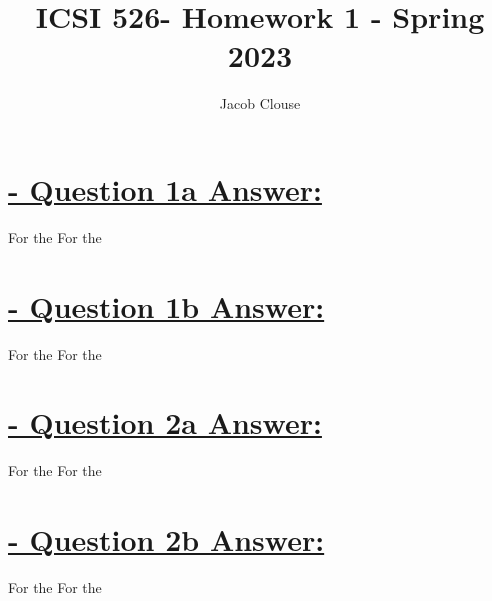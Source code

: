\documentclass{article}
\author{Jacob Clouse}
\title{ICSI 526- Homework 1 - Spring 2023}
\begin{document}
	
\maketitle	
	
\section{\underline{ - Question 1a Answer:}}
For the 
\newline
\newline
For the 
\newline

\section{\underline{ - Question 1b Answer:}}
For the 
\newline
\newline
For the 
\newline

\section{\underline{ - Question 2a Answer:}}
For the 
\newline
\newline
For the 
\newline

\section{\underline{ - Question 2b Answer:}}
For the 
\newline
\newline
For the 
\newline
\end{document}
